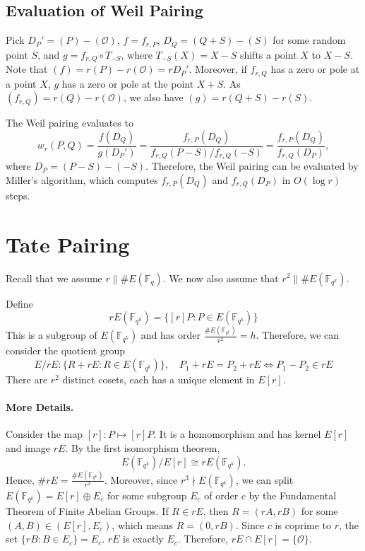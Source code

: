 \subsection{Evaluation of Weil Pairing}

Pick $D_P' = (P) - (\mathcal{O})$, $f = f_{r,P}$, $D_Q = (Q+S) - (S)$ for some random point $S$, and $g = f_{r,Q}\circ T_{-S}$, where $T_{-S}(X) = X-S$ shifts a point $X$ to $X-S$. Note that $(f) = r(P) - r(\mathcal{O}) = rD_P'$. Moreover, if $f_{r,Q}$ has a zero or pole at a point $X$, $g$ has a zero or pole at the point $X+S$. As $(f_{r,Q}) = r(Q) - r(\mathcal{O})$, we also have $(g) = r(Q+S) - r(S)$. 
    
The Weil pairing evaluates to
\[
	w_r(P, Q) = \frac{f(D_Q)}{g(D_P')} = \frac{f_{r,P}(D_Q)}{f_{r,Q}(P-S) / f_{r,Q}(-S)} = \frac{f_{r,P}(D_Q)}{f_{r,Q}(D_P)},
\]
where $D_P = (P-S) - (-S)$. Therefore, the Weil pairing can be evaluated by Miller’s algorithm, which computes $f_{r,P}(D_Q)$ and $f_{r,Q}(D_P)$ in $O(\log r)$ steps.



\section{Tate Pairing}

Recall that we assume $r \| \#E(\mathbb{F}_q)$. We now also assume that $r^2 \| \#E(\mathbb{F}_{q^k})$.

Define
\[
	rE(\mathbb{F}_{q^k}) = \{[r]P: P \in E(\mathbb{F}_{q^k})\}
\]
This is a subgroup of $E(\mathbb{F}_{q^k})$ and has order $\frac{\#E(\mathbb{F}_{q^k})}{r^2} = h$. Therefore, we can consider the quotient group
\[
	E/rE: \{R + rE: R \in E(\mathbb{F}_{q^k})\}, \quad P_1 + rE = P_2 + rE \Leftrightarrow P_1-P_2 \in rE
\]
There are $r^2$ distinct cosets, each has a unique element in $E[r]$.

\paragraph{More Details.}
    
Consider the map $[r]: P \mapsto [r]P$. It is a homomorphism and has kernel $E[r]$ and image $rE$. By the first isomorphism theorem,
\[
    E(\mathbb{F}_{q^k}) / E[r] \cong rE(\mathbb{F}_{q^k}).
\]
Hence, $\#rE = \frac{\#E(\mathbb{F}_{q^k})}{r^2}$. Moreover, since $r^3 \nmid E(\mathbb{F}_{q^k})$, we can split $E(\mathbb{F}_{q^k}) = E[r] \oplus E_c$ for some subgroup $E_c$ of order $c$ by the Fundamental Theorem of Finite Abelian Groups. If $R \in rE$, then $R = (rA, rB)$ for some $(A, B) \in (E[r], E_c)$, which means $R = (0, rB)$. Since $c$ is coprime to $r$, the set $\{rB: B \in E_c\} = E_c$. $rE$ is exactly $E_c$. Therefore, $rE \cap E[r] = \{\mathcal{O}\}$.
    
